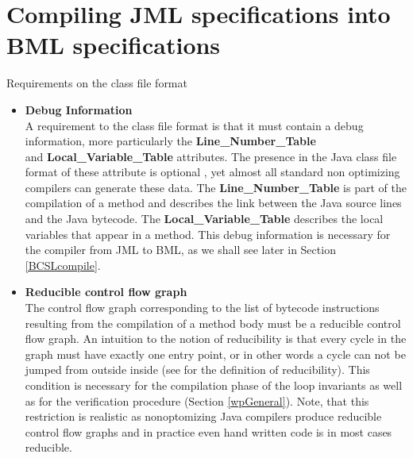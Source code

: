 
\section{Compiling JML specifications into BML specifications}
Requirements on the class file format
\begin{itemize}
  \item \textbf{Debug Information} \\ A requirement to the class file
  format is that it must contain a debug information, more
  particularly the \textbf{Line\_Number\_Table} \\ and
  \textbf{Local\_Variable\_Table} attributes. The presence in the Java
  class file format of these attribute is optional \cite{VMSpec}, yet
  almost all standard non optimizing compilers can generate these
  data. The \textbf{Line\_Number\_Table} is part of the compilation of
  a method and describes the link between the Java source lines and
  the Java bytecode.  The \textbf{Local\_Variable\_Table} describes
  the local variables that appear in a method.  This debug information
  is necessary for the compiler from JML to BML, as we shall see later
  in Section \ref{BCSLcompile}.

\item  \textbf{Reducible control flow graph} \\ 
       The control flow graph corresponding to the list of bytecode
       instructions resulting from the compilation of a method body
       must be a reducible control flow graph. An intuition to the
       notion of reducibility is that every cycle in the graph must
       have exactly one entry point, or in other words a cycle can not
       be jumped from outside inside (see \cite{ARUCom1986} for the
       definition of reducibility). This condition is necessary for
       the compilation phase of the loop invariants as well as for the
       verification procedure (Section \ref{wpGeneral}).  Note, that
       this restriction is realistic as nonoptomizing Java compilers
       produce reducible control flow graphs and in practice even hand
       written code is in most cases reducible.
\end{itemize}

